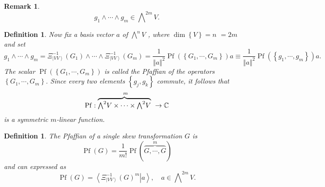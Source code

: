 \documentclass[aps,preprint]{revtex4}%
\newtheorem{definition}[theorem]{Definition}
\newtheorem{remark}[theorem]{Remark}
\begin{document}
\begin{remark}%
\begin{equation}
g_{1}\wedge\cdots\wedge g_{m}\in%
{\textstyle\bigwedge\nolimits^{2m}}
V.
\end{equation}

\end{remark}

\begin{definition}
Now fix a basis vector $a$ of $%
{\textstyle\bigwedge\nolimits^{n}}
V$ , where $\dim\left\{  V\right\}  =n$ $=2m$ and set
\begin{equation}
g_{1}\wedge\cdots\wedge g_{m}=\mathcal{\Xi}_{\left\vert VV\right\rangle }%
^{-1}\left(  G_{1}\right)  \wedge\cdots\wedge\mathcal{\Xi}_{\left\vert
VV\right\rangle }^{-1}\left(  G_{m}\right)  =\frac{1}{\left\Vert a\right\Vert
^{2}}\operatorname{Pf}\left(  \left\{  G_{1},\cdots,G_{m}\right\}  \right)
a\equiv\frac{1}{\left\Vert a\right\Vert ^{2}}\operatorname{Pf}\left(  \left\{
g_{1},\cdots,g_{m}\right\}  \right)  a.
\end{equation}
The scalar $\operatorname{Pf}\left(  \left\{  G_{1},\cdots,G_{m}\right\}
\right)  $ is called the Pfaffian of the operators $\left\{  G_{1}%
,\cdots,G_{m}\right\}  $. Since every two elements $\left\{  g_{j}%
,g_{k}\right\}  $ commute, it follows that
\begin{equation}
\operatorname{Pf}:\overset{m}{\overbrace{%
{\textstyle\bigwedge\nolimits^{2}}
V\times\cdots\times%
{\textstyle\bigwedge\nolimits^{2}}
V}\,\,}\rightarrow\mathbb{C}%
\end{equation}
is a \emph{symmetric} $m$-linear function.
\end{definition}

\begin{definition}
The Pfaffian of a single skew transformation $G$ is
\begin{equation}
\operatorname{Pf}\left(  G\right)  =\frac{1}{m!}\operatorname{Pf}\left(
\overset{m}{\overbrace{G,\cdots,G}}\right)
\end{equation}
and can expressed as
\begin{equation}
\operatorname{Pf}\left(  G\right)  =\left\langle \left.  \Xi_{\left\vert
VV\right\rangle }^{-1}\left(  G\right)  ^{m}\right\vert a\right\rangle ,\quad
a\in%
{\textstyle\bigwedge\nolimits^{2m}}
V.
\end{equation}

\end{definition}
\end{document}
